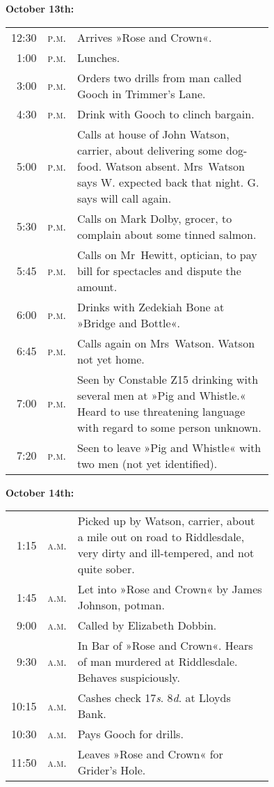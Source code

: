 \begin{samepage}
\textbf{October 13th:}	\\
\begin{tabular} {r l p{0.75\linewidth} } 
12:30&\textsc{p.m.}&Arrives »Rose and Crown«.\\
1:00&\textsc{p.m.}&Lunches.\\
3:00&\textsc{p.m.}&Orders two drills from man called Gooch in Trimmer's Lane.\\
4:30&\textsc{p.m.}&Drink with Gooch to clinch bargain.\\
5:00&\textsc{p.m.}&Calls at house of John Watson, carrier, about delivering some dog-food. Watson absent. Mrs~Watson says W. expected back that night. G. says will call again.\\
5:30&\textsc{p.m.}&Calls on Mark Dolby, grocer, to complain about some tinned salmon.\\
5:45&\textsc{p.m.}&Calls on Mr~Hewitt, optician, to pay bill for spectacles and dispute the amount.\\
6:00&\textsc{p.m.}&Drinks with Zedekiah Bone at »Bridge and Bottle«.\\
6:45&\textsc{p.m.}&Calls again on Mrs~Watson. Watson not yet home.\\
7:00&\textsc{p.m.}&Seen by Constable Z15 drinking with several men at »Pig and Whistle.« Heard to use threatening language with regard to some person unknown.\\
7:20&\textsc{p.m.}&Seen to leave »Pig and Whistle« with two men (not yet identified).\\
\end{tabular}
\end{samepage}

\begin{samepage}

\textbf{October 14th:}	\\
\begin{tabular} {r l p{0.75\linewidth} } 
1:15&\textsc{a.m.}&Picked up by Watson, carrier, about a mile out on road to Riddlesdale, very dirty and ill-tempered, and not quite sober.\\
1:45&\textsc{a.m.}&Let into »Rose and Crown« by James Johnson, potman.\\
9:00&\textsc{a.m.}&Called by Elizabeth Dobbin.\\
9:30&\textsc{a.m.}&In Bar of »Rose and Crown«. Hears of man murdered at Riddlesdale. Behaves suspiciously.\\
10:15&\textsc{a.m.}&Cashes check \textsterling 129 17\textit{s}. 8\textit{d}. at Lloyds Bank.\\
10:30&\textsc{a.m.}&Pays Gooch for drills.\\
11:50&\textsc{a.m.}&Leaves »Rose and Crown« for Grider's Hole.\\
\end{tabular}
\end{samepage}

